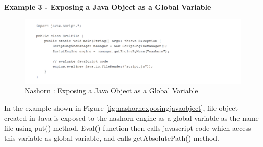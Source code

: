 \textbf{Example 3 - Exposing a Java Object as a Global Variable}



\begin{figure}[ht]
	\begin{center}
		\includegraphics[width=\linewidth]{./images/nashronScriptFile.png}
	\end{center}
	\caption{Nashorn : Exposing a Java Object as a Global Variable}
	\label{fig:nashronScriptFile}
\end{figure}

In the example shown in Figure \ref{fig:nashornexposingjavaobject}, file object created in Java is exposed to the nashorn engine as a global variable as the name file using put() method. Eval() function then calls javascript code which access this variable as global variable, and calls getAbsolutePath() method.